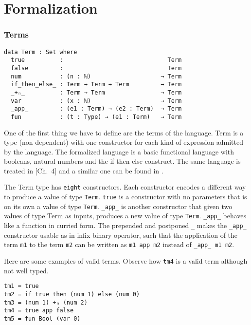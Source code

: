 \documentclass{article}
\begin{document}
\section{Formalization}

\subsubsection*{Terms}

\begin{verbatim}
data Term : Set where
  true          :                              Term
  false         :                              Term
  num           : (n : ℕ)                    → Term
  if_then_else_ : Term → Term → Term         → Term
  _+ₙ_          : Term → Term                → Term
  var           : (x : ℕ)                    → Term
  _app_         : (e1 : Term) → (e2 : Term)  → Term
  fun           : (t : Type) → (e1 : Term)   → Term
\end{verbatim}

One of the first thing we have to define are the terms of the language.
Term is a type (non-dependent) with one constructor for each kind of expression admitted by the language.
The formalized language is a basic functional language with booleans, natural numbers and the if-then-else construct.
The same language is treated in \cite{crafa}[Ch.\ 4] and a similar one can be found in \cite[Ch.\ 9]{pierce}.

The Term type has \texttt{eight} constructors.
Each constructor encodes a different way to produce a value of type \texttt{Term}.
\texttt{true} is a constructor with no parameters that is on its own a value of type \texttt{Term}.
\texttt{\_app\_} is another constructor that given two values of type Term as inputs, produces a new value of type \texttt{Term}.
\texttt{\_app\_} behaves like a function in curried form.
The prepended and postponed \texttt{\_} makes the \texttt{\_app\_} constructor usable as in infix binary operator, such that the application of the term \texttt{m1} to the term \texttt{m2} can be written as \texttt{m1 app m2} instead of \texttt{\_app\_ m1 m2}.

Here are some examples of valid terms.
Observe how \texttt{tm4} is a valid term although not well typed.

\begin{verbatim}
tm1 = true
tm2 = if true then (num 1) else (num 0)
tm3 = (num 1) +ₙ (num 2)
tm4 = true app false
tm5 = fun Bool (var 0)
\end{verbatim}
\end{document}
